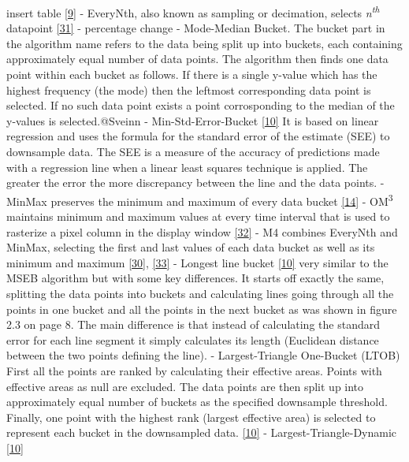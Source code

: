 \documentclass{article}
\begin{document}
insert table \protect\hyperlink{ref-datapoint}{{[}9{]}} - EveryNth, also
known as sampling or decimation, selects \emph{n\textsuperscript{th}}
datapoint \protect\hyperlink{ref-EveryNth}{{[}31{]}} - percentage change
- Mode-Median Bucket. The bucket part in the algorithm name refers to
the data being split up into buckets, each containing approximately
equal number of data points. The algorithm then finds one data point
within each bucket as follows. If there is a single y-value which has
the highest frequency (the mode) then the leftmost corresponding data
point is selected. If no such data point exists a point corrosponding to
the median of the y-values is selected.@Sveinn - Min-Std-Error-Bucket
\protect\hyperlink{ref-Sveinn}{{[}10{]}} It is based on linear
regression and uses the formula for the standard error of the estimate
(SEE) to downsample data. The SEE is a measure of the accuracy of
predictions made with a regression line when a linear least squares
technique is applied. The greater the error the more discrepancy between
the line and the data points. - MinMax preserves the minimum and maximum
of every data bucket \protect\hyperlink{ref-MinMaxLTTB}{{[}14{]}} -
OM\textsuperscript{3} maintains minimum and maximum values at every time
interval that is used to rasterize a pixel column in the display window
\protect\hyperlink{ref-MinMaxOrdered}{{[}32{]}} - M4 combines EveryNth
and MinMax, selecting the first and last values of each data bucket as
well as its minimum and maximum
\protect\hyperlink{ref-dashql}{{[}30{]}},
\protect\hyperlink{ref-M4}{{[}33{]}} - Longest line bucket
\protect\hyperlink{ref-Sveinn}{{[}10{]}} very similar to the MSEB
algorithm but with some key differences. It starts off exactly the same,
splitting the data points into buckets and calculating lines going
through all the points in one bucket and all the points in the next
bucket as was shown in figure 2.3 on page 8. The main difference is that
instead of calculating the standard error for each line segment it
simply calculates its length (Euclidean distance between the two points
defining the line). - Largest-Triangle One-Bucket (LTOB) First all the
points are ranked by calculating their effective areas. Points with
effective areas as null are excluded. The data points are then split up
into approximately equal number of buckets as the specified downsample
threshold. Finally, one point with the highest rank (largest effective
area) is selected to represent each bucket in the downsampled data.
\protect\hyperlink{ref-Sveinn}{{[}10{]}} - Largest-Triangle-Dynamic
\protect\hyperlink{ref-Sveinn}{{[}10{]}}
\end{document}
